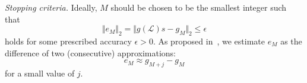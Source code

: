 \documentclass{article}
\newcommand{\Lap}{\mathcal{L}}
\begin{document}
% 

\textit{Stopping criteria.} Ideally, $M$ should be chosen to be the smallest integer such that 
\begin{equation*}
\Vert e_M \Vert_2 = \Vert g(\Lap)s - g_M \Vert_2\leq \epsilon 
\end{equation*} 
holds for some prescribed accuracy $\epsilon>0$. 
As proposed in~\cite{vandeneshof2006preconditioning}, we estimate $e_M$ as the difference of two (consecutive) approximations:
\begin{equation}
\label{eq:err_est}
e_M \approx g_{M+j} - g_{M}
\end{equation}
for a small value of $j$.
\end{document}
